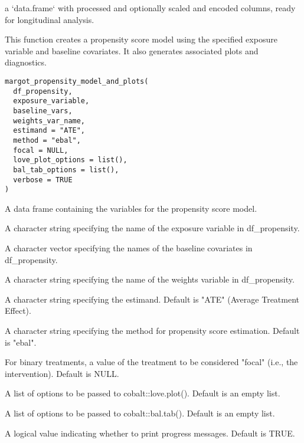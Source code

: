 \documentclass[a4paper]{book}
\begin{document}
%
\begin{Value}
a `data.frame` with processed and optionally scaled and encoded columns, ready for longitudinal analysis.
\end{Value}
%
\begin{Description}
This function creates a propensity score model using the specified exposure variable
and baseline covariates. It also generates associated plots and diagnostics.
\end{Description}
%
\begin{Usage}
\begin{verbatim}
margot_propensity_model_and_plots(
  df_propensity,
  exposure_variable,
  baseline_vars,
  weights_var_name,
  estimand = "ATE",
  method = "ebal",
  focal = NULL,
  love_plot_options = list(),
  bal_tab_options = list(),
  verbose = TRUE
)
\end{verbatim}
\end{Usage}
%
\begin{Arguments}
\begin{ldescription}
\item[\code{df\_propensity}] A data frame containing the variables for the propensity score model.

\item[\code{exposure\_variable}] A character string specifying the name of the exposure variable in df\_propensity.

\item[\code{baseline\_vars}] A character vector specifying the names of the baseline covariates in df\_propensity.

\item[\code{weights\_var\_name}] A character string specifying the name of the weights variable in df\_propensity.

\item[\code{estimand}] A character string specifying the estimand. Default is "ATE" (Average Treatment Effect).

\item[\code{method}] A character string specifying the method for propensity score estimation. Default is "ebal".

\item[\code{focal}] For binary treatments, a value of the treatment to be considered "focal" (i.e., the intervention). Default is NULL.

\item[\code{love\_plot\_options}] A list of options to be passed to cobalt::love.plot(). Default is an empty list.

\item[\code{bal\_tab\_options}] A list of options to be passed to cobalt::bal.tab(). Default is an empty list.

\item[\code{verbose}] A logical value indicating whether to print progress messages. Default is TRUE.
\end{ldescription}
\end{Arguments}
\end{document}
